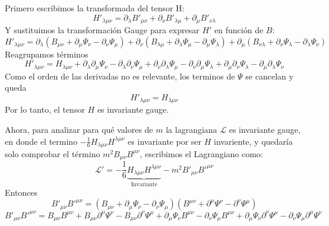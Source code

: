 \documentclass{article}
\begin{document}
\begin{enumerate}
    Primero escribimos la transformada del tensor H:
    \[H'_{\lambda\mu\nu } = \partial_{\lambda} B'_{\mu\nu } + \partial_{\nu} B'_{\lambda\mu} + \partial_{\mu } B'_{\nu \lambda }\]
    Y sustituimos la transformación Gauge para expresar $H'$ en función de $B$:
    \[H'_{\lambda\mu\nu } = \partial_{\lambda} \left(B_{\mu\nu } + \partial_{\mu} \Psi_{\nu} - \partial_{\nu } \Psi_{\mu} \right) + \partial_{\nu} \left(B_{\lambda\mu} + \partial_{\lambda  } \Psi_{\mu} - \partial_{\mu } \Psi_{\lambda} \right) + \partial_{\mu } \left(B_{\nu \lambda} + \partial_{\nu } \Psi_{\lambda} - \partial_{\lambda } \Psi_{\nu} \right) \]
    Reagrupamos términos 
    \[H'_{\lambda\mu\nu } =H_{\lambda\mu\nu } + \partial_{\lambda}\partial_{\mu} \Psi_{\nu} - \partial_{\lambda}\partial_{\nu} \Psi_{\mu} + \partial_{\nu}\partial_{\lambda  } \Psi_{\mu} - \partial_{\nu }\partial_{\mu} \Psi_{\lambda} + \partial_{\mu }\partial_{\nu} \Psi_{\lambda } - \partial_{\mu }\partial_{\lambda } \Psi_{\nu } \]
    Como el orden de las derivadas no es relevante, los terminos de $\Psi$ se cancelan y queda 
    \[H'_{\lambda\mu\nu } = H_{\lambda\mu\nu } \]
    Por lo tanto, el tensor $H$ es invariante gauge.

    Ahora, para analizar para qué valores de $m$ la lagrangiana $\mathcal{L}$ es invariante gauge, en donde el termino $- \frac{1}{6} H_{\lambda\mu\nu } H^{\lambda\mu\nu }$ es invariante por ser $H$ invariente, y quedaría solo comprobar el término $m^2 B_{\mu\nu} B^{\mu\nu}$, escribimos el Lagrangiano como:
    \[
    \mathcal{L}' = - \frac{1}{6} \underbrace{H_{\lambda\mu\nu } H^{\lambda\mu\nu }}_{\text{Invariante}} - m^2 B'_{\mu\nu} B'^{\mu\nu}
    \]
    Entonces 
    \[B'_{\mu\nu} B'^{\mu\nu}= \left(B_{\mu\nu} + \partial_{\mu} \Psi_{\nu} - \partial_{\nu} \Psi_{\mu}\right)\left(B^{\mu\nu} + \partial^{\mu} \Psi^{\nu} - \partial^{\nu} \Psi^{\mu}\right)\]
    \[B'_{\mu\nu} B'^{\mu\nu}=B_{\mu\nu} B^{\mu\nu} + B_{\mu\nu} \partial^{\mu} \Psi^{\nu} - B_{\mu\nu} \partial^{\nu} \Psi^{\mu} + \partial_{\mu} \Psi_{\nu} B^{\mu\nu} - \partial_{\nu} \Psi_{\mu} B^{\mu\nu} + \partial_{\mu} \Psi_{\nu} \partial^{\nu} \Psi^{\mu} - \partial_{\nu} \Psi_{\mu} \partial^{\mu} \Psi^{\nu} \]
\end{enumerate}
\end{document}
